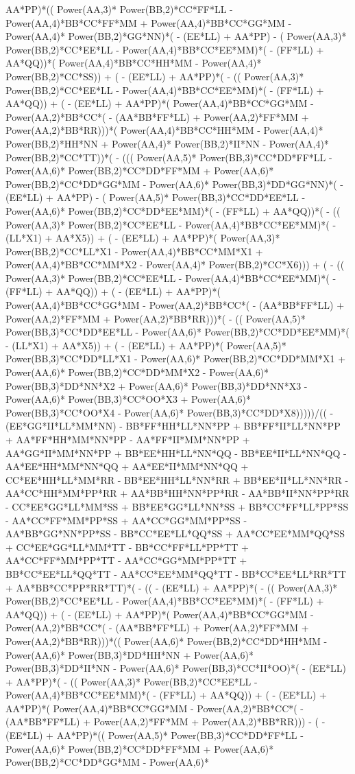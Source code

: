 \documentclass[10pt]{article} %
\begin{document}
{AA*PP)*(( Power(AA,3)* Power(BB,2)*CC*FF*LL -  Power(AA,4)*BB*CC*FF*MM +  Power(AA,4)*BB*CC*GG*MM -  Power(AA,4)* Power(BB,2)*GG*NN)*( - (EE*LL) + AA*PP) - ( Power(AA,3)* Power(BB,2)*CC*EE*LL -  Power(AA,4)*BB*CC*EE*MM)*( - (FF*LL) + AA*QQ))*( Power(AA,4)*BB*CC*HH*MM -  Power(AA,4)* Power(BB,2)*CC*SS)) + ( - (EE*LL) + AA*PP)*( - (( Power(AA,3)* Power(BB,2)*CC*EE*LL -  Power(AA,4)*BB*CC*EE*MM)*( - (FF*LL) + AA*QQ)) + ( - (EE*LL) + AA*PP)*( Power(AA,4)*BB*CC*GG*MM -  Power(AA,2)*BB*CC*( - (AA*BB*FF*LL) +  Power(AA,2)*FF*MM +  Power(AA,2)*BB*RR)))*( Power(AA,4)*BB*CC*HH*MM -  Power(AA,4)* Power(BB,2)*HH*NN +  Power(AA,4)* Power(BB,2)*II*NN -  Power(AA,4)* Power(BB,2)*CC*TT))*( - ((( Power(AA,5)* Power(BB,3)*CC*DD*FF*LL -  Power(AA,6)* Power(BB,2)*CC*DD*FF*MM +  Power(AA,6)* Power(BB,2)*CC*DD*GG*MM -  Power(AA,6)* Power(BB,3)*DD*GG*NN)*( - (EE*LL) + AA*PP) - ( Power(AA,5)* Power(BB,3)*CC*DD*EE*LL -  Power(AA,6)* Power(BB,2)*CC*DD*EE*MM)*( - (FF*LL) + AA*QQ))*( - (( Power(AA,3)* Power(BB,2)*CC*EE*LL -  Power(AA,4)*BB*CC*EE*MM)*( - (LL*X1) + AA*X5)) + ( - (EE*LL) + AA*PP)*( Power(AA,3)* Power(BB,2)*CC*LL*X1 -  Power(AA,4)*BB*CC*MM*X1 +  Power(AA,4)*BB*CC*MM*X2 -  Power(AA,4)* Power(BB,2)*CC*X6))) + ( - (( Power(AA,3)* Power(BB,2)*CC*EE*LL -  Power(AA,4)*BB*CC*EE*MM)*( - (FF*LL) + AA*QQ)) + ( - (EE*LL) + AA*PP)*( Power(AA,4)*BB*CC*GG*MM -  Power(AA,2)*BB*CC*( - (AA*BB*FF*LL) +  Power(AA,2)*FF*MM +  Power(AA,2)*BB*RR)))*( - (( Power(AA,5)* Power(BB,3)*CC*DD*EE*LL -  Power(AA,6)* Power(BB,2)*CC*DD*EE*MM)*( - (LL*X1) + AA*X5)) + ( - (EE*LL) + AA*PP)*( Power(AA,5)* Power(BB,3)*CC*DD*LL*X1 -  Power(AA,6)* Power(BB,2)*CC*DD*MM*X1 +  Power(AA,6)* Power(BB,2)*CC*DD*MM*X2 -  Power(AA,6)* Power(BB,3)*DD*NN*X2 +  Power(AA,6)* Power(BB,3)*DD*NN*X3 -  Power(AA,6)* Power(BB,3)*CC*OO*X3 +  Power(AA,6)* Power(BB,3)*CC*OO*X4 -  Power(AA,6)* Power(BB,3)*CC*DD*X8)))))/(( - (EE*GG*II*LL*MM*NN) - BB*FF*HH*LL*NN*PP + BB*FF*II*LL*NN*PP + AA*FF*HH*MM*NN*PP - AA*FF*II*MM*NN*PP + AA*GG*II*MM*NN*PP + BB*EE*HH*LL*NN*QQ - BB*EE*II*LL*NN*QQ - AA*EE*HH*MM*NN*QQ + AA*EE*II*MM*NN*QQ + CC*EE*HH*LL*MM*RR - BB*EE*HH*LL*NN*RR + BB*EE*II*LL*NN*RR - AA*CC*HH*MM*PP*RR + AA*BB*HH*NN*PP*RR - AA*BB*II*NN*PP*RR - CC*EE*GG*LL*MM*SS + BB*EE*GG*LL*NN*SS + BB*CC*FF*LL*PP*SS - AA*CC*FF*MM*PP*SS + AA*CC*GG*MM*PP*SS - AA*BB*GG*NN*PP*SS - BB*CC*EE*LL*QQ*SS + AA*CC*EE*MM*QQ*SS + CC*EE*GG*LL*MM*TT - BB*CC*FF*LL*PP*TT + AA*CC*FF*MM*PP*TT - AA*CC*GG*MM*PP*TT + BB*CC*EE*LL*QQ*TT - AA*CC*EE*MM*QQ*TT - BB*CC*EE*LL*RR*TT + AA*BB*CC*PP*RR*TT)*( - (( - (EE*LL) + AA*PP)*( - (( Power(AA,3)* Power(BB,2)*CC*EE*LL -  Power(AA,4)*BB*CC*EE*MM)*( - (FF*LL) + AA*QQ)) + ( - (EE*LL) + AA*PP)*( Power(AA,4)*BB*CC*GG*MM -  Power(AA,2)*BB*CC*( - (AA*BB*FF*LL) +  Power(AA,2)*FF*MM +  Power(AA,2)*BB*RR)))*(( Power(AA,6)* Power(BB,2)*CC*DD*HH*MM -  Power(AA,6)* Power(BB,3)*DD*HH*NN +  Power(AA,6)* Power(BB,3)*DD*II*NN -  Power(AA,6)* Power(BB,3)*CC*II*OO)*( - (EE*LL) + AA*PP)*( - (( Power(AA,3)* Power(BB,2)*CC*EE*LL -  Power(AA,4)*BB*CC*EE*MM)*( - (FF*LL) + AA*QQ)) + ( - (EE*LL) + AA*PP)*( Power(AA,4)*BB*CC*GG*MM -  Power(AA,2)*BB*CC*( - (AA*BB*FF*LL) +  Power(AA,2)*FF*MM +  Power(AA,2)*BB*RR))) - ( - (EE*LL) + AA*PP)*(( Power(AA,5)* Power(BB,3)*CC*DD*FF*LL -  Power(AA,6)* Power(BB,2)*CC*DD*FF*MM +  Power(AA,6)* Power(BB,2)*CC*DD*GG*MM -  Power(AA,6)* }
\end{document}
